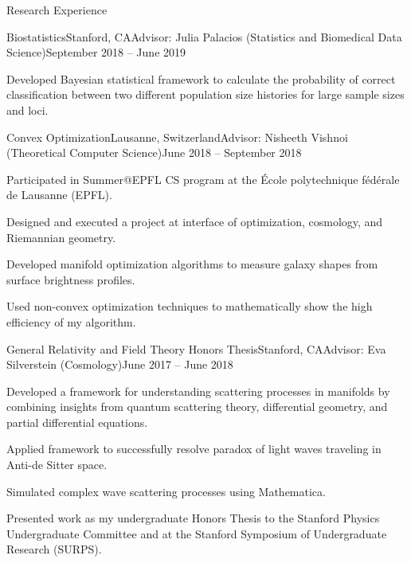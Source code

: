 \documentclass{resume} %
\begin{document}
\begin{rSection}{Research Experience}
\begin{rSubsection}{Biostatistics}{Stanford, CA}{Advisor: Julia Palacios (Statistics and Biomedical Data Science)}{September 2018 -- June 2019}
\item Developed Bayesian statistical framework to calculate the probability of correct classification between two different population size histories for large sample sizes and loci. 


\end{rSubsection}

\begin{rSubsection}{ Convex Optimization}{Lausanne, Switzerland}{Advisor: Nisheeth Vishnoi (Theoretical Computer Science)}{June 2018 -- September 2018}
\item Participated in Summer@EPFL CS program at the \'Ecole polytechnique f\'ed\'erale de Lausanne (EPFL).
\item Designed and executed a project at interface of optimization, cosmology, and Riemannian geometry.
\item Developed manifold optimization algorithms to measure galaxy shapes from surface brightness profiles.
\item Used non-convex optimization techniques to mathematically show the high efficiency of my algorithm.
\end{rSubsection}
\begin{rSubsection}{General Relativity and Field Theory Honors Thesis}{Stanford, CA}{Advisor: Eva Silverstein (Cosmology)}{June 2017 -- June 2018}
\item Developed a framework for understanding scattering processes in manifolds by combining insights from quantum scattering theory, differential geometry, and partial differential equations. 
\item Applied framework to successfully resolve paradox of light waves traveling in Anti-de Sitter space. 
\item Simulated complex wave scattering processes using Mathematica. 
\item Presented work as my undergraduate Honors Thesis to the Stanford Physics Undergraduate Committee and at the Stanford Symposium of Undergraduate Research (SURPS).                        
\end{rSubsection}
\end{rSection}
\end{document}
